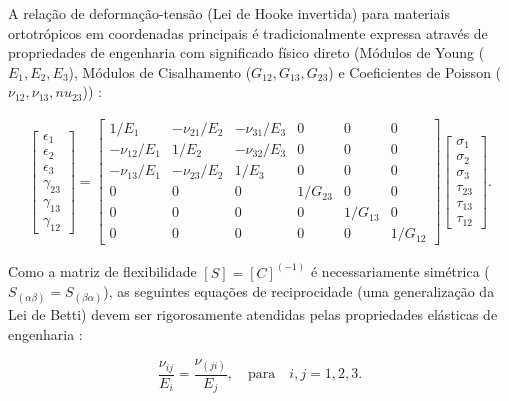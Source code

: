 A relação de deformação-tensão (Lei de Hooke invertida) para materiais ortotrópicos em coordenadas principais é tradicionalmente expressa através de propriedades de engenharia com significado físico direto (Módulos de Young ($E_1, E_2, E_3$), Módulos de Cisalhamento ($G_{12}, G_{13}, G_{23}$) e Coeficientes de Poisson ($\nu_{12}, \nu_{13}, nu_{23}$)) \cite{Sadd2009}:

\begin{equation}
  \begin{aligned}
    \begin{bmatrix}
  \epsilon_1 \\
  \epsilon_2 \\
  \epsilon_3 \\
  \gamma_{23} \\
  \gamma_{13} \\
  \gamma_{12}
\end{bmatrix} 
= 
\begin{bmatrix}
  1/E_1 & -\nu_{21}/E_2 & -\nu_{31}/E_3 & 0 & 0 & 0 \\
  -\nu_12/E_1 & 1/E_2 & -\nu_{32}/E_3 & 0 & 0 & 0 \\
  -\nu_13/E_1 & -\nu_23/E_2 & 1/E_3 & 0 & 0 & 0 \\
  0 & 0 & 0 & 1/G_{23} & 0 & 0 \\
0 & 0 & 0 & 0 & 1/G_{13} & 0 \\
  0 & 0 & 0 & 0 & 0 & 1/G_{12}
\end{bmatrix} \begin{bmatrix}
  \sigma_1 \\
  \sigma_2 \\
  \sigma_3 \\
  \tau_{23} \\
  \tau_{13} \\
  \tau_{12}
\end{bmatrix}.
  \end{aligned}
  \label{eq:orthotropic_compliance}
\end{equation}

Como a matriz de flexibilidade $[S] = [C]^{(-1)}$ é necessariamente simétrica ($S_{(\alpha\beta)} = S_{(\beta\alpha)}$), as seguintes equações de reciprocidade (uma generalização da Lei de Betti) devem ser rigorosamente atendidas pelas propriedades elásticas de engenharia \cite{Timoshenko_1951}:

\begin{equation}
    \frac{\nu_{ij}}{E_i} = \frac{\nu_{(ji)}}{E_j} , \quad \text{para} \quad i, j = 1, 2, 3.  
\end{equation}\label{eq:betti_reciprocity}

